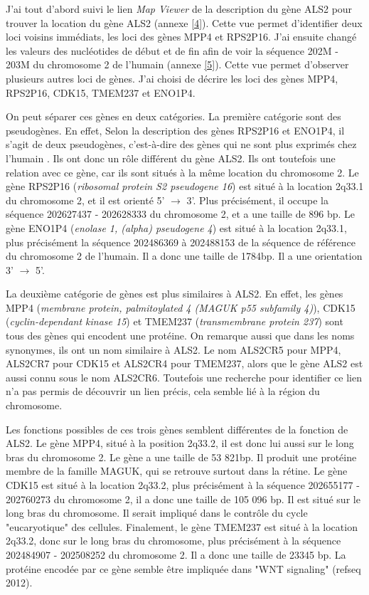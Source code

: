 \documentclass[10.9pt]{article} %
\begin{document}
J'ai tout d'abord suivi le lien \emph{Map Viewer} de la description du gène ALS2 pour trouver la location 
du gène ALS2 (annexe \ref{4}).  Cette vue permet d'identifier deux loci voisins immédiats, les loci des gènes 
MPP4 et RPS2P16. J'ai ensuite changé les valeurs des nucléotides de début et de fin afin de voir la
séquence 202M - 203M du chromosome 2 de l'humain (annexe \ref{5}). Cette vue permet d'observer plusieurs autres
loci de gènes. J'ai choisi de décrire les loci des gènes MPP4, RPS2P16, CDK15, TMEM237 et ENO1P4.

On peut séparer ces gènes en deux catégories. La première catégorie sont des pseudogènes. En effet,
Selon la description des gènes RPS2P16 et ENO1P4, il s'agit de deux pseudogènes, c'est-à-dire des
gènes qui ne sont plus exprimés chez l'humain \cite{Wikipedia-pseudo}. Ils ont donc un rôle différent du gène ALS2. Ils ont toutefois
une relation avec ce gène, car ils sont situés à la même location du chromosome 2. Le gène RPS2P16 
(\emph{ribosomal protein S2 pseudogene 16}) est situé à la location 2q33.1 du chromosome 2, et il 
est orienté 5' $\rightarrow$ 3'. Plus précisément, il occupe la séquence 202627437 - 202628333 du 
chromosome 2, et a une taille de 896 bp. Le gène ENO1P4 (\emph{enolase 1, (alpha) pseudogene 4})
est situé  à la location 2q33.1, plus précisément la séquence 202486369 à 202488153 de la séquence de référence
du chromosome 2 de l'humain. Il a donc une taille de 1784bp. Il a une orientation 3' $\rightarrow$ 5'. 

La deuxième catégorie de gènes est plus similaires à ALS2. En effet, les gènes MPP4 
(\emph{membrane protein, palmitoylated 4 (MAGUK p55 subfamily 4)}), CDK15 (\emph{cyclin-dependant kinase 15}) et
TMEM237 (\emph{transmembrane protein 237}) sont tous des gènes qui encodent une protéine. On remarque
aussi que dans les noms synonymes, ils ont un nom similaire à ALS2. Le nom ALS2CR5 pour MPP4, ALS2CR7 pour CDK15 et
ALS2CR4 pour TMEM237, alors que le gène ALS2 est aussi connu sous le nom ALS2CR6. Toutefois une recherche pour
identifier ce lien n'a pas permis de découvrir un lien précis, cela semble lié à la région du chromosome.

Les fonctions possibles de ces trois gènes semblent différentes de la fonction de ALS2. Le gène 
MPP4, situé à la position 2q33.2, il est donc lui aussi sur le long bras du chromosome 2. 
Le gène a une taille de 53 821bp. Il 
produit une protéine membre de la famille MAGUK, qui se retrouve surtout dans la rétine. Le gène CDK15 est situé
à la location 2q33.2, plus précisément à la séquence 202655177 - 202760273 du chromosome 2, il a donc une taille 
de 105 096 bp. Il est situé sur le long bras du chromosome. Il serait impliqué 
dans le contrôle du cycle "eucaryotique" des cellules. Finalement, le gène TMEM237 est situé à la location 2q33.2,
donc sur le long bras du chromosome, plus précisément à la séquence 202484907 - 202508252 du chromosome 2. Il a donc
une taille de 23345 bp. La protéine encodée par ce gène semble être impliquée dans "WNT signaling" (refseq 2012). 
\end{document}

